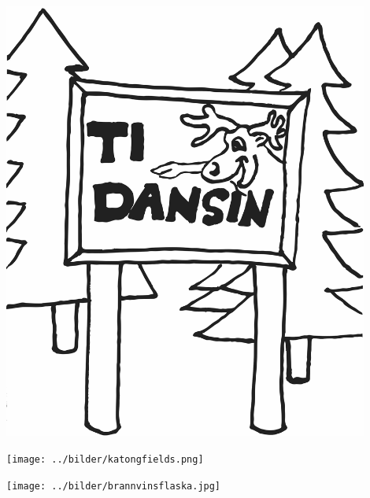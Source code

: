 %

\begin{intersong}
\sffamily\bfseries\LARGE{}
	\begin{center}
		\vspace{10mm}
	\includegraphics[width=0.9\textwidth]{../bilder/fardigabilder/BilderTillKapitel/tidansin.png}
\end{center} 
\end{intersong}
\sclearpage

\sclearpage

\begin{intersong}
	\begin{center}
		\vspace{20mm}
		\texttt{[image: ../bilder/katongfields.png]} 
	\end{center}
\end{intersong}

\sclearpage

\begin{intersong}
\begin{center}
\texttt{[image: ../bilder/brannvinsflaska.jpg]} 
\end{center}
\end{intersong}
\sclearpage




